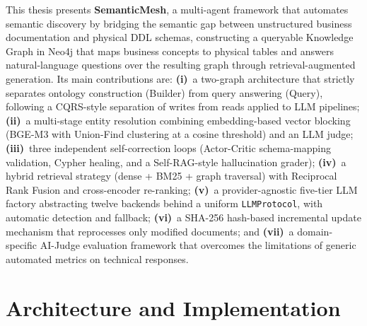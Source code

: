 \documentclass[11pt,a4paper]{article}
\begin{document}
This thesis presents \textbf{SemanticMesh}, a multi-agent framework that automates semantic discovery by bridging the semantic gap between unstructured business documentation and physical DDL schemas, constructing a queryable Knowledge Graph in Neo4j that maps business concepts to physical tables and answers natural-language questions over the resulting graph through retrieval-augmented generation. Its main contributions are: \textbf{(i)}~a two-graph architecture that strictly separates ontology construction (Builder) from query answering (Query), following a CQRS-style separation of writes from reads applied to LLM pipelines; \textbf{(ii)}~a multi-stage entity resolution combining embedding-based vector blocking (BGE-M3 with Union-Find clustering at a cosine threshold) and an LLM judge; \textbf{(iii)}~three independent self-correction loops (Actor-Critic schema-mapping validation, Cypher healing, and a Self-RAG-style hallucination grader); \textbf{(iv)}~a hybrid retrieval strategy (dense + BM25 + graph traversal) with Reciprocal Rank Fusion and cross-encoder re-ranking; \textbf{(v)}~a provider-agnostic five-tier LLM factory abstracting twelve backends behind a uniform \texttt{LLMProtocol}, with automatic detection and fallback; \textbf{(vi)}~a SHA-256 hash-based incremental update mechanism that reprocesses only modified documents; and \textbf{(vii)}~a domain-specific AI-Judge evaluation framework that overcomes the limitations of generic automated metrics on technical responses.

\section{Architecture and Implementation}
\end{document}
